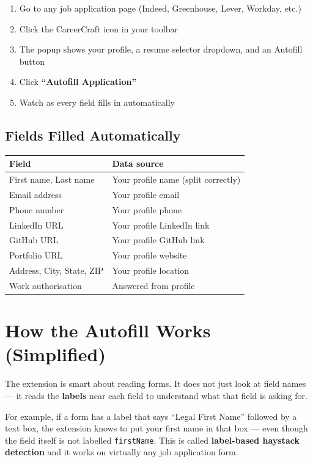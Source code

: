 \documentclass[12pt, a4paper]{report}
\newcommand{\code}[1]{\texttt{\small #1}}
\begin{document}
\begin{enumerate}
  \item Go to any job application page (Indeed, Greenhouse, Lever, Workday, etc.)
  \item Click the CareerCraft icon in your toolbar
  \item The popup shows your profile, a resume selector dropdown, and an Autofill button
  \item Click \textbf{``Autofill Application''}
  \item Watch as every field fills in automatically
\end{enumerate}

\subsection{Fields Filled Automatically}

\begin{center}
\begin{tabular}{ll}
\toprule
\textbf{Field} & \textbf{Data source} \\
\midrule
First name, Last name & Your profile name (split correctly) \\
Email address         & Your profile email \\
Phone number          & Your profile phone \\
LinkedIn URL          & Your profile LinkedIn link \\
GitHub URL            & Your profile GitHub link \\
Portfolio URL         & Your profile website \\
Address, City, State, ZIP & Your profile location \\
Work authorisation    & Answered from profile \\
\bottomrule
\end{tabular}
\end{center}

\section{How the Autofill Works (Simplified)}

The extension is smart about reading forms.  It does not just look at field
names --- it reads the \textbf{labels} near each field to understand what that
field is asking for.

For example, if a form has a label that says ``Legal First Name'' followed by a
text box, the extension knows to put your first name in that box --- even though
the field itself is not labelled \code{firstName}.  This is called
\textbf{label-based haystack detection} and it works on virtually any job
application form.
\end{document}
